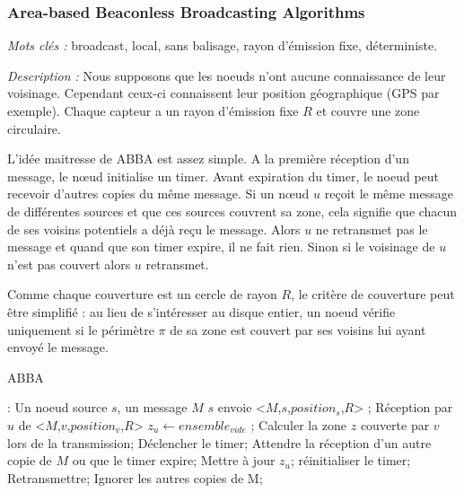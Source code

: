 \subsubsection{Area-based Beaconless Broadcasting Algorithms \cite{Ovalle2006}}
\emph{Mots clés :} broadcast, local, sans balisage, rayon d'émission fixe, déterministe.

\emph{Description :} Nous supposons que les noeuds n'ont aucune connaissance de leur voisinage. Cependant ceux-ci connaissent leur position géographique (GPS par exemple). Chaque capteur a un rayon d'émission fixe $R$ et couvre une zone circulaire.

L'idée maitresse de ABBA est assez simple. A la première réception d'un message, le nœud initialise un timer. Avant expiration du timer, le noeud peut recevoir d'autres copies du même message. Si un nœud $u$ reçoit le même message de différentes sources et que ces sources couvrent sa zone, cela signifie que chacun de ses voisins potentiels a déjà reçu le message. Alors $u$ ne retransmet pas le message et quand que son timer expire, il ne fait rien. Sinon si le voisinage de $u$ n'est pas couvert alors $u$ retransmet.

Comme chaque couverture est un cercle de rayon $R$, le critère de couverture peut être simplifié : au lieu de s'intéresser au disque entier, un noeud vérifie uniquement si le périmètre $\pi$ de sa zone est couvert par ses voisins lui ayant envoyé le message.


\begin{algorithm}[H]
\caption{ABBA}
\label{ABBA}
\begin{algorithmic}
\REQUIRE:
Un noeud source $s$, un message $M$
\STATE $s$ envoie  <$M$,$s$,$position_s$,$R$> ;
\STATE Réception  par  $u$ de  <$M$,$v$,$position_v$,$R$>
\STATE $z_u\leftarrow ensemble_{vide}$ ;
\STATE Calculer la zone $z$ couverte par $v$ lors de la transmission;
\STATE Déclencher le timer;
\REPEAT
    \STATE Attendre la réception d'un autre copie de $M$ ou que le timer expire;
	\STATE Mettre à jour $z_u$;
	\STATE réinitialiser le timer;
    \ENDIF
{}
    \STATE Retransmettre;
\ENDIF
     \STATE Ignorer les autres copies de M;

\end{algorithmic}
\end{algorithm}


